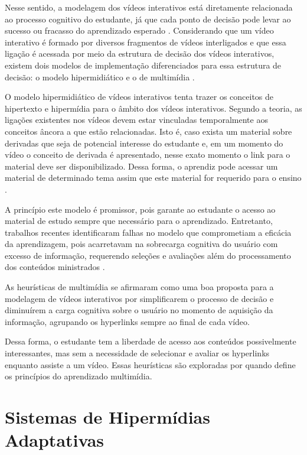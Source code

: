 Nesse sentido, a modelagem dos vídeos interativos está diretamente relacionada ao processo cognitivo do estudante, já que cada ponto de decisão pode levar ao sucesso ou fracasso do aprendizado esperado \cite{mayer2001,moreno2000}. Considerando que um vídeo interativo é formado por diversos fragmentos de vídeos interligados e que essa ligação é acessada por meio da estrutura de decisão dos vídeos interativos, existem dois modelos de implementação diferenciados para essa estrutura de decisão: o modelo hipermidiático e o de multimídia \cite{wetzel1994} .

O modelo hipermidiático de vídeos interativos tenta trazer os conceitos de hipertexto e hipermídia para o âmbito dos vídeos interativos. Segundo a teoria, as ligações existentes nos vídeos devem estar vinculadas temporalmente aos conceitos âncora a que estão relacionadas. Isto é, caso exista um material sobre derivadas que seja de potencial interesse do estudante e, em um momento do vídeo o conceito de derivada é apresentado, nesse exato momento o link para o material deve ser disponibilizado. Dessa forma, o aprendiz pode acessar um material de determinado tema assim que este material for requerido para o ensino \cite{wetzel1994}.

A princípio este modelo é promissor, pois garante ao estudante o acesso ao material de estudo sempre que necessário para o aprendizado. Entretanto, trabalhos recentes identificaram falhas no modelo que comprometiam a eficácia da aprendizagem, pois acarretavam na sobrecarga cognitiva do usuário com excesso de informação, requerendo seleções e avaliações além do processamento dos conteúdos ministrados \cite{zhang2005}.

As heurísticas de multimídia se afirmaram como uma boa proposta para a modelagem de vídeos interativos por simplificarem o processo de decisão e diminuírem a carga cognitiva sobre o usuário no momento de aquisição da informação, agrupando os  hyperlinks sempre ao final de cada vídeo. 

Dessa forma, o estudante tem a liberdade de acesso aos conteúdos possivelmente interessantes, mas sem a necessidade de selecionar e avaliar os hyperlinks enquanto assiste a um vídeo. Essas heurísticas são exploradas por \cite{mayer2014} quando define os princípios do aprendizado multimídia.


\section{Sistemas de Hipermídias Adaptativas}


